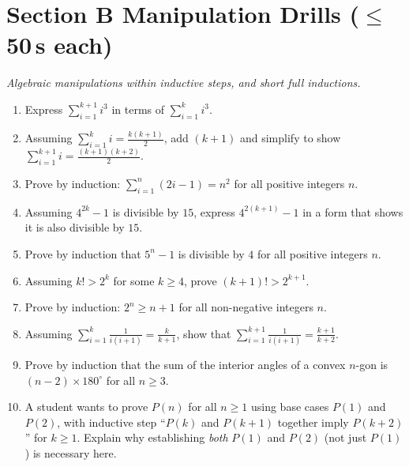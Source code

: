 \documentclass[11pt,a4paper]{article}
\begin{document}
\section*{Section B \quad Manipulation Drills \hfill{\normalfont\small($\leq$50\,s each)}}

\noindent\textit{Algebraic manipulations within inductive steps, and short full inductions.}

\begin{enumerate}

\item Express $\sum_{i=1}^{k+1} i^3$ in terms of $\sum_{i=1}^k i^3$.

\item Assuming $\sum_{i=1}^k i=\frac{k(k+1)}{2}$, add $(k+1)$ and simplify to show $\sum_{i=1}^{k+1} i=\frac{(k+1)(k+2)}{2}$.

\item Prove by induction: $\sum_{i=1}^n (2i-1)=n^2$ for all positive integers $n$.

\item Assuming $4^{2k}-1$ is divisible by $15$, express $4^{2(k+1)}-1$ in a form that shows it is also divisible by $15$.

\item Prove by induction that $5^n-1$ is divisible by $4$ for all positive integers $n$.

\item Assuming $k!>2^k$ for some $k\geq4$, prove $(k+1)!>2^{k+1}$.

\item Prove by induction: $2^n\geq n+1$ for all non-negative integers $n$.

\item Assuming $\sum_{i=1}^k \frac1{i(i+1)}=\frac{k}{k+1}$, show that $\sum_{i=1}^{k+1}\frac1{i(i+1)}=\frac{k+1}{k+2}$.

\item Prove by induction that the sum of the interior angles of a convex $n$-gon is $(n-2)\times180^\circ$ for all $n\geq3$.

\item A student wants to prove $P(n)$ for all $n\geq1$ using base cases $P(1)$ and $P(2)$, with inductive step ``$P(k)$ and $P(k+1)$ together imply $P(k+2)$'' for $k\geq1$. Explain why establishing \emph{both} $P(1)$ and $P(2)$ (not just $P(1)$) is necessary here.

\end{enumerate}
\end{document}
